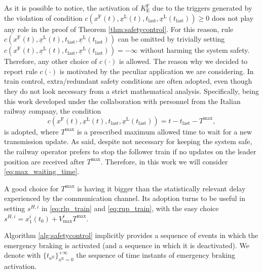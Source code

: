 \begin{remark}
	As it is possible to notice, the activation of $K_\mathrm{E}^\mathrm{F}$ due to the triggers generated by 
	the violation of condition $c(x^\mathrm{F}(t),\underline{x}^\mathrm{L}(t),t_{\mathrm{last}},\underline{x}^\mathrm{L}(t_{\mathrm{last}})) \geq 0$
	does not play any role in the proof of Theorem \ref{thm:safetycontrol}. For this reason, rule $c(x^\mathrm{F}(t),\underline{x}^\mathrm{L}(t),t_{\mathrm{last}},\underline{x}^\mathrm{L}(t_{\mathrm{last}}))$ can be omitted by trivially setting $c(x^\mathrm{F}(t),\underline{x}^\mathrm{L}(t),t_{\mathrm{last}},\underline{x}^\mathrm{L}(t_{\mathrm{last}}))=-\infty$ without harming the system safety. Therefore, any other choice of $c(\cdot)$ is allowed. 
	The reason why we decided to report rule $c(\cdot)$ is motivated by the peculiar application we are considering. In train control, extra/redundant safety conditions are often adopted, even though they do not look necessary from a strict mathematical analysis. 
	Specifically, being this work developed under the collaboration with personnel from the Italian railway company, the condition
	\begin{equation}\label{eq:max_waiting_time}
		c(x^\mathrm{F}(t),\underline{x}^\mathrm{L}(t),t_{\mathrm{last}},\underline{x}^\mathrm{L}(t_{\mathrm{last}}))= t-t_{\mathrm{last}}-T^{\max},
	\end{equation}
	is adopted, where $T^{\max}$ is a prescribed maximum allowed time to wait for a new transmission update. 
	As said, despite not necessary for keeping the system safe, the railway operator prefers to stop the follower train if no updates on the leader position are received after $T^{\max}$. Therefore, in this work we will consider \eqref{eq:max_waiting_time}.
\end{remark}

A good choice for $T^{\max}$ is having it bigger than the statistically relevant delay experienced by the communication channel.
Its adoption turns to be useful in setting $s^{H,i}$ in \eqref{eq:rlp_train} and \eqref{eq:rup_train}, with the easy choice $s^{H,i}=x_1^i(t_0)+V^i_{\max} T^{\max}$.

Algorithm \ref{alg:safetycontrol} implicitly provides a sequence of events in which the emergency braking is activated (and a sequence in which it is deactivated). We denote with 
$\{ t_{\kappa^\mathrm{E}} \}_{\kappa^\mathrm{E} =0}^{+\infty}$ the sequence of time instants of emergency braking activation. 





